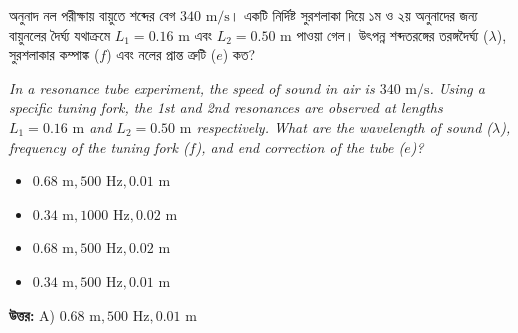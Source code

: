 \documentclass[12pt, a4paper]{article}
\begin{document}
\begin{tcolorbox}[questionbox={প্রশ্ন (Question) 18}]
    \noindent
    অনুনাদ নল পরীক্ষায় বায়ুতে শব্দের বেগ $340\text{ m/s}$। একটি নির্দিষ্ট সুরশলাকা দিয়ে ১ম ও ২য় অনুনাদের জন্য বায়ুনলের দৈর্ঘ্য যথাক্রমে $L_1 = 0.16\text{ m}$ এবং $L_2 = 0.50\text{ m}$ পাওয়া গেল। উৎপন্ন শব্দতরঙ্গের তরঙ্গদৈর্ঘ্য ($\lambda$), সুরশলাকার কম্পাঙ্ক ($f$) এবং নলের প্রান্ত ত্রুটি ($e$) কত?
    
    \vspace{0.8em}
    \begin{english}
    \noindent\textit{\color{darkgray}
    In a resonance tube experiment, the speed of sound in air is $340\text{ m/s}$. Using a specific tuning fork, the 1st and 2nd resonances are observed at lengths $L_1 = 0.16\text{ m}$ and $L_2 = 0.50\text{ m}$ respectively. What are the wavelength of sound ($\lambda$), frequency of the tuning fork ($f$), and end correction of the tube ($e$)?
    }
    \end{english}
\end{tcolorbox}

\begin{itemize}[label={}, leftmargin=1cm, itemsep=0.5em]
    \item[\textbf{A)}] $0.68\text{ m}, 500\text{ Hz}, 0.01\text{ m}$
    \item[\textbf{B)}] $0.34\text{ m}, 1000\text{ Hz}, 0.02\text{ m}$
    \item[\textbf{C)}] $0.68\text{ m}, 500\text{ Hz}, 0.02\text{ m}$
    \item[\textbf{D)}] $0.34\text{ m}, 500\text{ Hz}, 0.01\text{ m}$
\end{itemize}

\vspace{0.5em}
\begin{tcolorbox}[answerbox]
    \textbf{\color{success} উত্তর:} A) $0.68\text{ m}, 500\text{ Hz}, 0.01\text{ m}$
\end{tcolorbox}
\vspace{1em}
\end{document}
